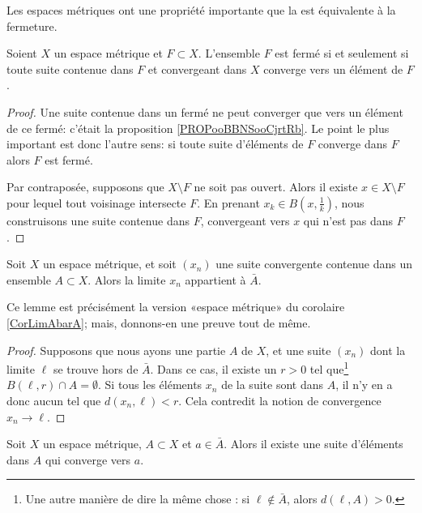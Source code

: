 Les espaces métriques ont une propriété importante que la  est équivalente à la fermeture.
\begin{proposition}    \label{PropLFBXIjt}
    Soient \( X\) un espace métrique et \( F\subset X\). L'ensemble \( F\) est fermé si et seulement si toute suite contenue dans \( F\) et convergeant dans \( X\) converge vers un élément de \( F\).
\end{proposition}

\begin{proof}
   Une suite contenue dans un fermé ne peut converger que vers un élément de ce fermé: c'était la proposition \ref{PROPooBBNSooCjrtRb}. Le point le plus important est donc l'autre sens: si toute suite d'éléments de \( F \) converge dans \( F \) alors \( F \) est fermé.
    
   Par contraposée, supposons que \( X\setminus F\) ne soit pas ouvert. Alors il existe \( x\in X\setminus F\) pour lequel tout voisinage intersecte \( F\). En prenant \( x_k\in B(x,\frac{1}{ k })\), nous construisons une suite contenue dans \( F\), convergeant vers \( x\) qui n'est pas dans \( F \).
\end{proof}


\begin{lemma}		\label{LemLimAbarA}
  Soit $X$ un espace métrique, et soit $(x_n)$ une suite convergente contenue dans un ensemble $A\subset X$. Alors la limite $x_n$ appartient à $\bar A$.
\end{lemma}
Ce lemme est précisément la version «espace métrique» du corolaire \ref{CorLimAbarA}; mais, donnons-en une preuve tout de même.
\begin{proof}
	Supposons que nous ayons une partie $A$ de $X$, et une suite $(x_n)$ dont la limite $\ell$ se trouve hors de $\bar A$. Dans ce cas, il existe un $r>0$ tel que\footnote{Une autre manière de dire la même chose : si $\ell\notin\bar A$, alors $d(\ell,A)>0$.} $B(\ell,r)\cap A=\emptyset$. Si tous les éléments $x_n$ de la suite sont dans $A$, il n'y en a donc aucun tel que $d(x_n,\ell)<r$. Cela contredit la notion de convergence $x_n\to \ell$.
\end{proof}

\begin{corollary}		\label{CorAdhEstLim}
  Soit $X$ un espace métrique, $A \subset X$ et $a \in \bar A$. Alors il existe une suite d'éléments dans $A$ qui converge vers $a$.
\end{corollary}

